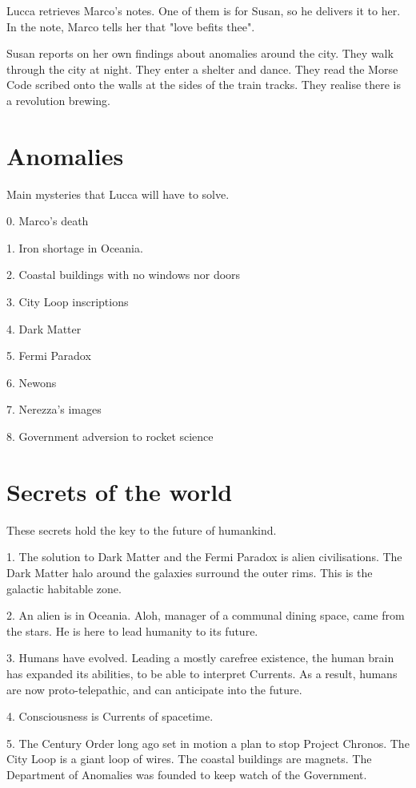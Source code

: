 \documentclass[11pt]{article}
\begin{document}
Lucca retrieves Marco's notes. One of them is for Susan, so he delivers it to her. In the note, Marco tells her that "love befits thee". 

Susan reports on her own findings about anomalies around the city.
They walk through the city at night. 
They enter a shelter and dance.
They read the Morse Code scribed onto the walls at the sides of the train tracks. 
They realise there is a revolution brewing.




\section{Anomalies}
Main mysteries that Lucca will have to solve.

0. Marco's death

1. Iron shortage in Oceania.

2. Coastal buildings with no windows nor doors

3. City Loop inscriptions

4. Dark Matter

5. Fermi Paradox

6. Newons

7. Nerezza's images

8. Government adversion to rocket science


\section{Secrets of the world}
These secrets hold the key to the future of humankind.

1. The solution to Dark Matter and the Fermi Paradox is alien civilisations. 
The Dark Matter halo around the galaxies surround the outer rims. 
This is the galactic habitable zone. 

2. An alien is in Oceania. 
Aloh, manager of a communal dining space, came from the stars. 
He is here to lead humanity to its future.

3. Humans have evolved. 
Leading a mostly carefree existence, the human brain has expanded its abilities, to be able to interpret Currents. 
As a result, humans are now proto-telepathic, and can anticipate into the future.

4. Consciousness is Currents of spacetime.

5. The Century Order long ago set in motion a plan to stop Project Chronos.
The City Loop is a giant loop of wires.
The coastal buildings are magnets.
The Department of Anomalies was founded to keep watch of the Government.
\end{document}
